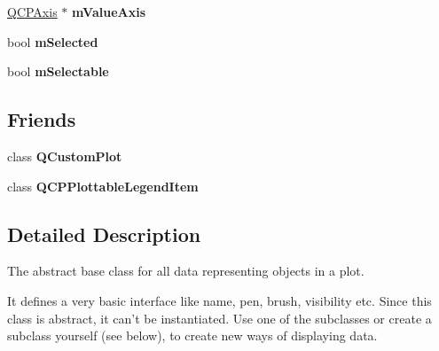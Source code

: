 \begin{DoxyCompactItemize}
\item 
\hypertarget{classQCPAbstractPlottable_acfc46d619ab9598be33b64146da45822}{\hyperlink{classQCPAxis}{Q\-C\-P\-Axis} $\ast$ {\bfseries m\-Value\-Axis}}\label{classQCPAbstractPlottable_acfc46d619ab9598be33b64146da45822}

\item 
\hypertarget{classQCPAbstractPlottable_a43f68a0603e9bcd016bdfa6d9d5c41c9}{bool {\bfseries m\-Selected}}\label{classQCPAbstractPlottable_a43f68a0603e9bcd016bdfa6d9d5c41c9}

\item 
\hypertarget{classQCPAbstractPlottable_aceee52342c8e75727abcbd164986fdcb}{bool {\bfseries m\-Selectable}}\label{classQCPAbstractPlottable_aceee52342c8e75727abcbd164986fdcb}

\end{DoxyCompactItemize}
\subsection*{Friends}
\begin{DoxyCompactItemize}
\item 
\hypertarget{classQCPAbstractPlottable_a1cdf9df76adcfae45261690aa0ca2198}{class {\bfseries Q\-Custom\-Plot}}\label{classQCPAbstractPlottable_a1cdf9df76adcfae45261690aa0ca2198}

\item 
\hypertarget{classQCPAbstractPlottable_a104c78e91302afd6842a903e472f552f}{class {\bfseries Q\-C\-P\-Plottable\-Legend\-Item}}\label{classQCPAbstractPlottable_a104c78e91302afd6842a903e472f552f}

\end{DoxyCompactItemize}


\subsection{Detailed Description}
The abstract base class for all data representing objects in a plot. 

It defines a very basic interface like name, pen, brush, visibility etc. Since this class is abstract, it can't be instantiated. Use one of the subclasses or create a subclass yourself (see below), to create new ways of displaying data.

